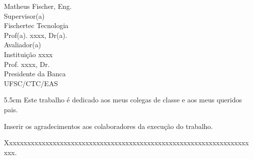\begin{folhadeaprovacao}
	\vspace*{2\baselineskip}
	Matheus Fischer, Eng.\\
	Supervisor(a) \\
	Fischertec Tecnologia\\
	
	\vspace*{2\baselineskip}
	Prof(a). xxxx, Dr(a).\\
	Avaliador(a) \\
	Instituição xxxx\\
	
	\vspace*{2\baselineskip}
	Prof. xxxx, Dr.\\
	Presidente da Banca \\
	UFSC/CTC/EAS
\end{folhadeaprovacao}

\begin{dedicatoria}
	\vspace*{\fill}
	\noindent
	\begin{adjustwidth*}{}{5.5cm} 
		\raggedleft       
		Este trabalho é dedicado aos meus colegas de classe e aos meus queridos pais.
	\end{adjustwidth*}
\end{dedicatoria}

\begin{agradecimentos}
	Inserir os agradecimentos aos colaboradores da execução do trabalho. 
	
	Xxxxxxxxxxxxxxxxxxxxxxxxxxxxxxxxxxxxxxxxxxxxxxxxxxxxxxxxxxxxxxxxxxxxxx. 
\end{agradecimentos}


